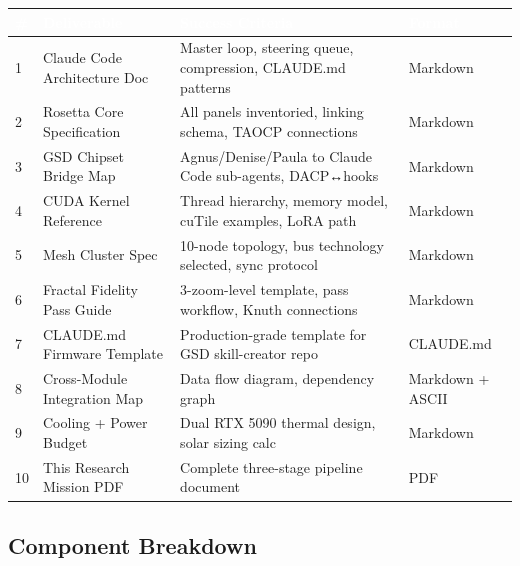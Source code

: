\documentclass[11pt,letterpaper]{article}
\newcommand{\tableheader}[1]{\textbf{\sffamily\textcolor{white}{#1}}}
\begin{document}
\begin{center}
\begin{tabularx}{\textwidth}{C{0.5cm}L{4cm}L{4cm}L{3cm}}
\toprule
{}
\tableheader{\#} & \tableheader{Deliverable} & \tableheader{Success Criteria} & \tableheader{Format} \\
 & Claude Code Architecture Doc & Master loop, steering queue, compression, CLAUDE.md patterns & Markdown \\
2 & Rosetta Core Specification & All panels inventoried, linking schema, TAOCP connections & Markdown \\
3 & GSD Chipset Bridge Map & Agnus/Denise/Paula to Claude Code sub-agents, DACP↔hooks & Markdown \\
4 & CUDA Kernel Reference & Thread hierarchy, memory model, cuTile examples, LoRA path & Markdown \\
5 & Mesh Cluster Spec & 10-node topology, bus technology selected, sync protocol & Markdown \\
6 & Fractal Fidelity Pass Guide & 3-zoom-level template, pass workflow, Knuth connections & Markdown \\
7 & CLAUDE.md Firmware Template & Production-grade template for GSD skill-creator repo & CLAUDE.md \\
8 & Cross-Module Integration Map & Data flow diagram, dependency graph & Markdown + ASCII \\
9 & Cooling + Power Budget & Dual RTX 5090 thermal design, solar sizing calc & Markdown \\
10 & This Research Mission PDF & Complete three-stage pipeline document & PDF \\
\bottomrule
\end{tabularx}
\end{center}

\subsection{Component Breakdown}
\end{document}
